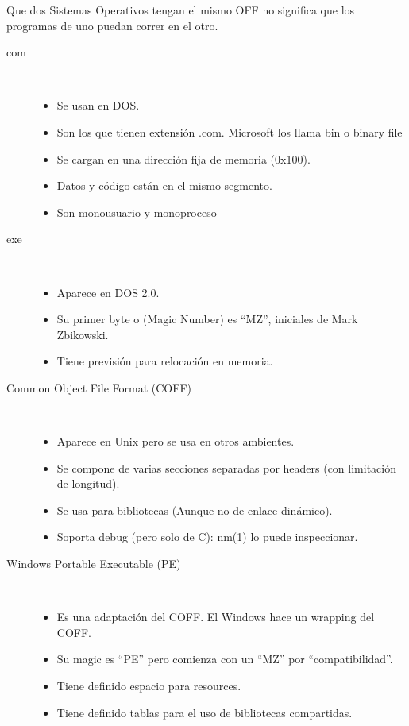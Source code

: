 \documentclass[a4paper, twoside]{article}
\begin{document}
Que dos Sistemas Operativos tengan el mismo OFF no significa que los programas de uno puedan correr en el otro.
\begin{description}
	\item[com] ~
	\begin{itemize}
		\item Se usan en DOS.
		\item Son los que tienen extensión .com. Microsoft los llama bin o binary file
		\item Se cargan en una dirección fija de memoria (0x100).
		\item Datos y código están en el mismo segmento.
		\item Son monousuario y monoproceso
	\end{itemize}

	\item[exe] ~
	\begin{itemize}
		\item Aparece en DOS 2.0.
		\item Su primer byte o (Magic Number) es “MZ”, iniciales de Mark Zbikowski.
		\item Tiene previsión para relocación en memoria.
	\end{itemize}

	\item[Common Object File Format (COFF)] ~
	\begin{itemize}
		\item Aparece en Unix pero se usa en otros ambientes.
		\item Se compone de varias secciones separadas por headers (con limitación de longitud).
		\item Se usa para bibliotecas (Aunque no de enlace dinámico).
		\item Soporta debug (pero solo de C): nm(1) lo puede inspeccionar.
	\end{itemize}

	\item[Windows Portable Executable (PE)] ~
	\begin{itemize}
		\item Es una adaptación del COFF. El Windows hace un wrapping del COFF.
		\item Su magic es “PE” pero comienza con un “MZ” por “compatibilidad”.
		\item Tiene definido espacio para resources.
		\item Tiene definido tablas para el uso de bibliotecas compartidas.
	\end{itemize}


\end{description}
\end{document}
